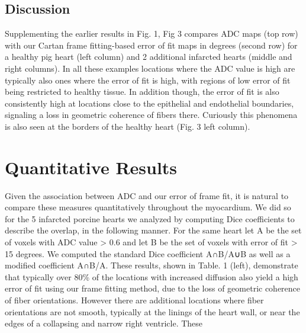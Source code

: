 \subsection{Discussion}

Supplementing the earlier results in Fig. 1, Fig 3 compares ADC maps (top row) with our Cartan frame fitting-based error of fit maps in degrees (second row) for a healthy pig heart (left column) and 2 additional infarcted hearts (middle and right columns). In all these examples locations where the ADC value is high are typically also ones where the error of fit is high, with regions of low error of fit being restricted to healthy tissue. In addition though, the error of fit is also consistently high at locations close to the epithelial and endothelial boundaries, signaling a loss in geometric coherence of fibers there. Curiously this phenomena is also seen at the borders of the healthy heart (Fig. 3 left column).

\section{Quantitative Results}

Given the association between ADC and our error of frame fit, it is natural to compare these measures quantitatively throughout the myocardium. We did so for the 5 infarcted porcine hearts we analyzed by computing Dice coefficients to describe the overlap, in the following manner. For the same heart let A be the set of voxels with ADC value > 0.6 and let B be the set of voxels with error of fit > 15 degrees. We computed the standard Dice coefficient A∩B/A∪B as well as a modified coefficient A∩B/A. These results, shown in Table. 1 (left), demonstrate that typically over 80\% of the locations with increased diffusion also yield a high error of fit using our frame fitting method, due to the loss of geometric coherence of fiber orientations. However there are additional locations where fiber orientations are not smooth, typically at the linings of the heart wall, or near the edges of a collapsing and narrow right ventricle. These